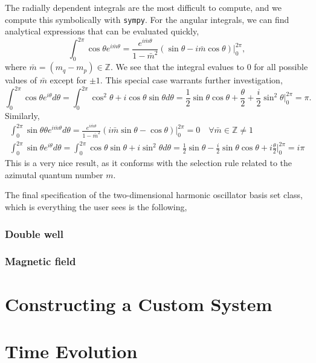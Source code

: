 The radially dependent integrals are the most difficult to compute, and we compute this 
symbolically with \lstinline{sympy}. For the angular integrals, we can find analytical 
expressions that can be evaluated quickly,
\begin{equation}
    \int_0^{2\pi} \cos \theta e^{i\bar{m} \theta} 
    = \frac{e^{i\bar{m}\theta}}{1 - \bar{m}^2}
        (\sin \theta - i \bar{m}\cos \theta)\Big\lvert_0^{2\pi},
\end{equation}
where $\bar{m} = (m_q - m_p) \in \mathbb{Z}$. We see that the integral evalues to $0$ 
for all possible values of $\bar{m}$ except for $\pm1$. This special case warrants further 
investigation,
\begin{equation}
        \int_0^{2\pi} \cos \theta e^{i\theta} d\theta 
        = \int_0^{2\pi} \cos^2\theta + i\cos\theta\sin \theta d\theta 
        = \frac{1}{2}\sin\theta\cos\theta + \frac{\theta}{2} + \frac{i}{2}\sin^2\theta
            \Big\lvert_0^{2\pi} = \pi.
\end{equation}
Similarly,
\begin{equation}
   \begin{gathered}
   \int_0^{2\pi} \sin\theta \theta e^{i\bar{m}\theta}d\theta 
    = \frac{e^{i\bar{m}\theta}}{1 - \bar{m}^2}
        (i\bar{m}\sin\theta - \cos\theta)\Big\lvert_0^{2\pi}
        = 0 \quad \forall \bar{m} \in \mathbb{Z} \neq 1 \\
    \int_0^{2\pi} \sin \theta e^{i \theta} d\theta 
    = \int_0^{2\pi} \cos\theta \sin\theta + i \sin^2\theta d\theta
    = \frac{1}{2} \sin\theta - \frac{i}{2}\sin\theta\cos\theta + i\frac{\theta}{2}
        \Big\lvert_0^{2\pi} = i\pi
   \end{gathered}
\end{equation}
This is a very nice result, as it conforms with the selection rule related to the 
azimutal quantum number $m$.

The final specification of the two-dimensional harmonic oscillator basis set class, which 
is everything the user sees is the following,



\subsubsection{Double well}



\subsubsection{Magnetic field}



\section{Constructing a Custom System}

\section{Time Evolution}

